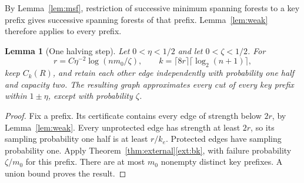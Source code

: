 \documentclass[11pt]{article}
\newtheorem{lemma}[theorem]{Lemma}
\theoremstyle{definition}
\begin{document}
By Lemma~\ref{lem:msf}, restriction of successive minimum spanning
forests to a key prefix gives successive spanning forests of that
prefix. Lemma~\ref{lem:weak} therefore applies to every prefix.

\begin{lemma}[One halving step]\label{lem:halving}
Let $0<\eta<1/2$ and let $0<\zeta<1/2$. For
\[
 r=C\eta^{-2}\log(nm_0/\zeta),\qquad
 k=\lceil8r\rceil\lceil\log_2(n+1)\rceil,
\]
keep $C_k(R)$, and retain each other edge independently with probability
one half and capacity two. The resulting graph approximates every cut of
every key prefix within $1\pm\eta$, except with probability $\zeta$.
\end{lemma}
\begin{proof}
Fix a prefix. Its certificate contains every edge of strength below $2r$,
by Lemma~\ref{lem:weak}. Every unprotected edge has strength at
least $2r$, so its sampling probability one half is at least $r/k_e$.
Protected edges have sampling probability one. Apply
Theorem~\ref{thm:external}\ref{ext:bk}, with failure probability
$\zeta/m_0$ for this prefix. There are at most $m_0$ nonempty distinct key
prefixes. A union bound proves the result.
\end{proof}
\end{document}
